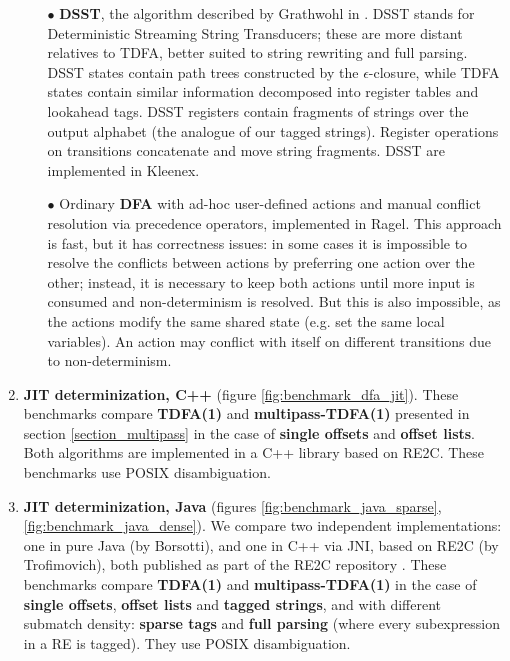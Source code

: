 \documentclass[]{article}
\begin{document}
\begin{enumerate}
\begin{itemize}
\item[$\bullet$]
\textbf{DSST}, the algorithm described by Grathwohl in \cite{Gra15}.
DSST stands for Deterministic Streaming String Transducers; these are more distant relatives to TDFA,
better suited to string rewriting and full parsing.
DSST states contain path trees constructed by the $\epsilon$-closure,
while TDFA states contain similar information decomposed into register tables and lookahead tags.
DSST registers contain fragments of strings over the output alphabet (the analogue of our tagged strings).
Register operations on transitions concatenate and move string fragments.
DSST are implemented in Kleenex.
\medskip

\item[$\bullet$]
Ordinary \textbf{DFA} with ad-hoc user-defined actions
and manual conflict resolution via precedence operators,
implemented in Ragel.
This approach is fast, but it has correctness issues:
in some cases it is impossible to resolve the conflicts between actions by preferring one action over the other;
instead, it is necessary to keep both actions until more input is consumed and non-determinism is resolved.
But this is also impossible, as the actions modify the same shared state (e.g. set the same local variables).
An action may conflict with itself on different transitions due to non-determinism.
\medskip

\end{itemize}

\item
\textbf{JIT determinization, C++}
(figure \ref{fig:benchmark_dfa_jit}).
These benchmarks compare \textbf{TDFA(1)} and \textbf{multipass-TDFA(1)} presented in section \ref{section_multipass}
in the case of \textbf{single offsets} and \textbf{offset lists}.
Both algorithms are implemented in a C++ library based on RE2C.
These benchmarks use POSIX disambiguation.
\medskip

\item
\textbf{JIT determinization, Java}
(figures \ref{fig:benchmark_java_sparse}, \ref{fig:benchmark_java_dense}).
We compare two independent implementations:
one in pure Java (by Borsotti),
and one in C++ via JNI, based on RE2C (by Trofimovich),
both published as part of the RE2C repository \cite{RE2CJava}.
These benchmarks compare \textbf{TDFA(1)} and \textbf{multipass-TDFA(1)}
in the case of \textbf{single offsets}, \textbf{offset lists} and \textbf{tagged strings},
and with different submatch density: \textbf{sparse tags} and \textbf{full parsing}
(where every subexpression in a RE is tagged).
They use POSIX disambiguation.
\medskip

\end{enumerate}
\end{document}
